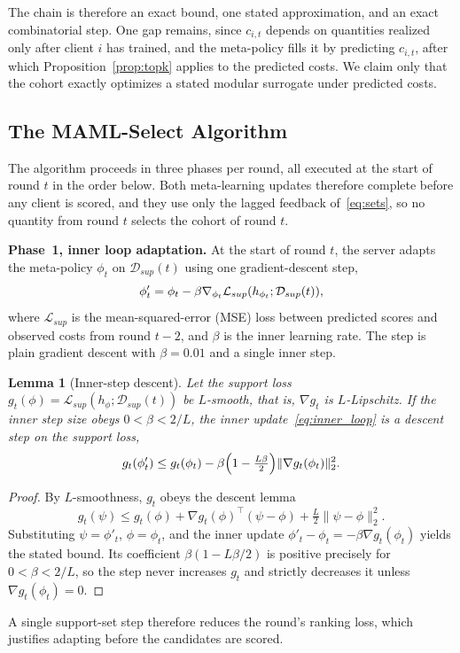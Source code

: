\documentclass[journal]{IEEEtran}
\newtheorem{Lemma}{Lemma}
\theoremstyle{remark}
\newcommand{\revision}[1]{#1}
\newcommand{\revtwo}[1]{#1}
\begin{document}
\revtwo{The chain is therefore an exact bound, one stated approximation, and an exact combinatorial step. One gap remains, since $c_{i,t}$ depends on quantities realized only after client $i$ has trained, and the meta-policy fills it by predicting $c_{i,t}$, after which Proposition~\ref{prop:topk} applies to the predicted costs. We claim only that the cohort exactly optimizes a stated modular surrogate under predicted costs.}

\subsection{The MAML-Select Algorithm}\label{sec:method_selection}
The algorithm proceeds in three phases per round\revtwo{, all executed at the start of round $t$ in the order below. Both meta-learning updates therefore complete before any client is scored, and they use only the lagged feedback of~\eqref{eq:sets}, so no quantity from round $t$ selects the cohort of round $t$}.

\textbf{Phase~1, inner loop adaptation.}
At the start of round $t$, \revision{the server adapts the meta-policy $\phi_t$ on $\mathcal{D}_{sup}(t)$ using one gradient-descent step,}
\begin{equation}
	\color{black}
		\phi'_t = \phi_t - \beta \nabla_{\phi_t} \mathcal{L}_{sup}(h_{\phi_t};\mathcal{D}_{sup}(t)),
		\label{eq:inner_loop}
\end{equation}
where $\mathcal{L}_{sup}$ is the mean-squared-error (MSE) loss between predicted scores and observed costs \revtwo{from round $t-2$}, and $\beta$ is the inner learning rate\revtwo{. The step is plain gradient descent with $\beta=0.01$ and a single inner step}.

{\color{black}
\begin{Lemma}[Inner-step descent]\label{stmt:inner}
Let the support loss $g_t(\phi)=\mathcal{L}_{sup}(h_\phi;\mathcal{D}_{sup}(t))$ be $L$-smooth, that is, $\nabla g_t$ is $L$-Lipschitz. If the inner step size obeys $0<\beta<2/L$, the inner update~\eqref{eq:inner_loop} is a descent step on the support loss,
\[
g_t(\phi'_t)\le g_t(\phi_t)-\beta\Bigl(1-\tfrac{L\beta}{2}\Bigr)\lVert\nabla g_t(\phi_t)\rVert_2^2 .
\]
\end{Lemma}
\begin{proof}
By $L$-smoothness, $g_t$ obeys the descent lemma
\[
g_t(\psi)\le g_t(\phi)+\nabla g_t(\phi)^{\top}(\psi-\phi)+\tfrac{L}{2}\lVert\psi-\phi\rVert_2^2 .
\]
Substituting $\psi=\phi'_t$, $\phi=\phi_t$, and the inner update $\phi'_t-\phi_t=-\beta\nabla g_t(\phi_t)$ yields the stated bound. Its coefficient $\beta(1-L\beta/2)$ is positive precisely for $0<\beta<2/L$, so the step never increases $g_t$ and strictly decreases it unless $\nabla g_t(\phi_t)=0$.
\end{proof}
A single support-set step therefore reduces the round's ranking loss, which justifies adapting before the candidates are scored.
}
\end{document}

